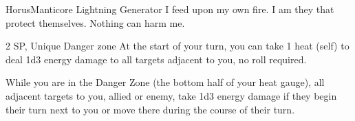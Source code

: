 \begin{mech}{Horus}{Manticore}
Lightning Generator
I feed upon my own fire. I am they that protect themselves. Nothing can harm me.

2 SP, Unique
Danger zone
At the start of your turn, you can take 1 heat (self) to deal 1d3 energy damage to all targets adjacent to you, no roll required.

While you are in the Danger Zone (the bottom half of your heat gauge), all adjacent targets to you, allied or enemy, take 1d3 energy damage if they begin their turn next to you or move there during the course of their turn.


\end{mech}
